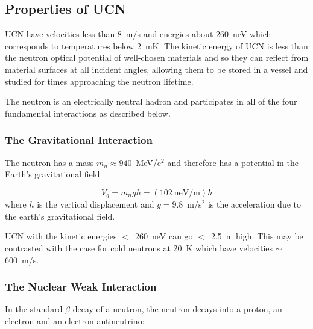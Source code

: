 \subsection{Properties of UCN}

UCN have velocities less than 8~m/s and energies about 260~neV which
corresponds to temperatures below 2~mK.  The kinetic energy of UCN is
less than the neutron optical potential of well-chosen materials and
so they can reflect from material surfaces at all incident angles,
allowing them to be stored in a vessel and studied for times
approaching the neutron lifetime.

The neutron is an electrically neutral hadron and participates in all
of the four fundamental interactions as described below.

\subsubsection{The Gravitational Interaction}
The neutron has a mass $m_n\approx 940$~MeV/c$^2$ and therefore has a
potential in the Earth's gravitational field

\begin{equation}
\label{egn:gravity}
V_{g}= m_n g h= (102 ~\textrm{neV/m}) h 
\end{equation}
where $h$ is the vertical displacement and $g=9.8$~m/s$^2$ is the
acceleration due to the earth's gravitational field.


UCN with the kinetic energies $<$~260~neV can go $<$~2.5~m high. This
may be contrasted with the case for cold neutrons at 20~K which have
velocities $\sim$600~m/s.
\subsubsection{The Nuclear Weak Interaction}
In the standard $\beta$-decay of a neutron, the neutron decays into a
proton, an electron and an electron antineutrino:


